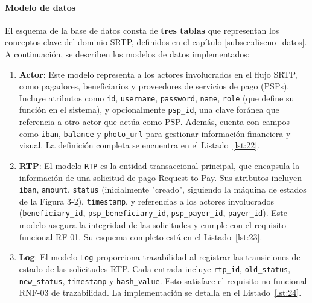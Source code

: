 \paragraph*{Modelo de datos}

El esquema de la base de datos consta de \textbf{tres tablas} que representan los conceptos clave del dominio SRTP, definidos en el capítulo \ref{subsec:diseno_datos}. A continuación, se describen los modelos de datos implementados:

\begin{enumerate}[label=\arabic*)]
    \item \textbf{Actor}: Este modelo representa a los actores involucrados en el flujo SRTP, como pagadores, beneficiarios y proveedores de servicios de pago (PSPs). Incluye atributos como \texttt{id}, \texttt{username}, \texttt{password}, \texttt{name}, \texttt{role} (que define su función en el sistema), y opcionalmente \texttt{psp\_id}, una clave foránea que referencia a otro actor que actúa como PSP. Además, cuenta con campos como \texttt{iban}, \texttt{balance} y \texttt{photo\_url} para gestionar información financiera y visual. La definición completa se encuentra en el Listado~\ref{lst:22}.
    
    \item \textbf{RTP}: El modelo \texttt{RTP} es la entidad transaccional principal, que encapsula la información de una solicitud de pago Request-to-Pay. Sus atributos incluyen \texttt{iban}, \texttt{amount}, \texttt{status} (inicialmente "creado", siguiendo la máquina de estados de la Figura 3-2), \texttt{timestamp}, y referencias a los actores involucrados (\texttt{beneficiary\_id}, \texttt{psp\_beneficiary\_id}, \texttt{psp\_payer\_id}, \texttt{payer\_id}). Este modelo asegura la integridad de las solicitudes y cumple con el requisito funcional RF-01. Su esquema completo está en el Listado~\ref{lst:23}.
    
    \item \textbf{Log}: El modelo \texttt{Log} proporciona trazabilidad al registrar las transiciones de estado de las solicitudes RTP. Cada entrada incluye \texttt{rtp\_id}, \texttt{old\_status}, \texttt{new\_status}, \texttt{timestamp} y \texttt{hash\_value}. Esto satisface el requisito no funcional RNF-03 de trazabilidad. La implementación se detalla en el Listado~\ref{lst:24}.
\end{enumerate}


